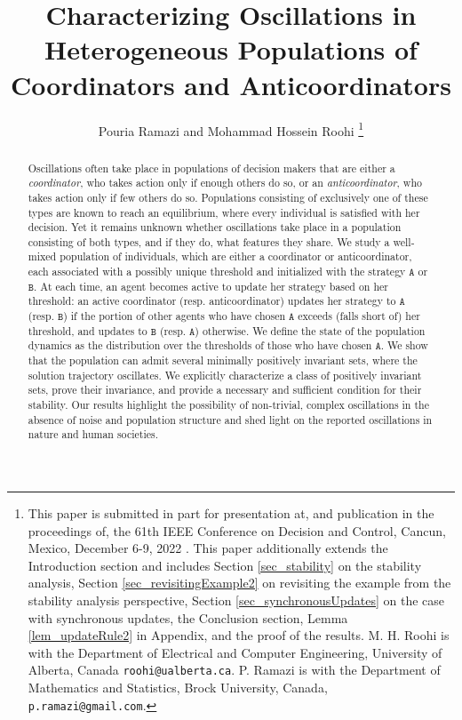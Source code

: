 \documentclass[10 pt,twocolumn,journal]{IEEEtran}
\theoremstyle{plain}
\newcommand{\A}{\mathcal{A}}
\renewcommand{\A}{\mathtt{A}}
\newcommand{\B}{\mathtt{B}}
\theoremstyle{definition}
\begin{document}
\title{Characterizing Oscillations in Heterogeneous Populations of Coordinators and Anticoordinators}
\author{{Pouria Ramazi and Mohammad Hossein Roohi}
\thanks{This paper is submitted in part for presentation at, and publication in the proceedings of, the 61th IEEE Conference on Decision and Control, Cancun, Mexico, December 6-9, 2022 \cite{conferenceVersion}.
This paper additionally extends the Introduction section and includes Section \ref{sec_stability} on the stability analysis, Section \ref{sec_revisitingExample2} on revisiting the example from the stability analysis perspective, Section \ref{sec_synchronousUpdates} on the case with synchronous updates, the Conclusion section, Lemma \ref{lem_updateRule2} in Appendix, and the proof of the results.  
M. H. Roohi is with the Department of Electrical and Computer Engineering, University of Alberta, Canada 
{\tt\small roohi@ualberta.ca}.
P. Ramazi is with
the Department of Mathematics and Statistics, Brock University, Canada,
{\tt\small p.ramazi@gmail.com}.}}%
	\maketitle 
	\begin{abstract}
    Oscillations often take place in populations of decision makers that are either a \emph{coordinator}, who takes action only if enough others do so, or an \emph{anticoordinator}, who takes action only if few others do so.
    Populations consisting of exclusively one of these types are known to reach an equilibrium, where every individual is satisfied with her decision.  
    Yet it remains unknown whether oscillations take place in a population consisting of both types, and if they do, what features they share.
    We study a well-mixed population of individuals, which are either a coordinator or anticoordinator, each associated with a possibly unique threshold and initialized with the strategy $\A$ or $\B$. 
    At each time, an agent becomes active to update her strategy based on her threshold: 
    an active coordinator (resp. anticoordinator) updates her strategy to $\A$ (resp. $\B$) if the portion of other agents who have chosen $\A$ exceeds (falls short of) her threshold, and updates to $\B$ (resp. $\A$) otherwise.
    We define the state of the population dynamics as the distribution over the thresholds of those who have chosen $\A$.
    We show that the population can admit several minimally positively invariant sets, where the solution trajectory oscillates. 
    We explicitly characterize a class of positively invariant sets, prove their invariance, and provide a necessary and sufficient condition for their stability. 
    Our results highlight the possibility of non-trivial, complex oscillations in the absence of noise and population structure and shed light on the reported oscillations in nature and human societies.
	\end{abstract}	
	
\end{document}
